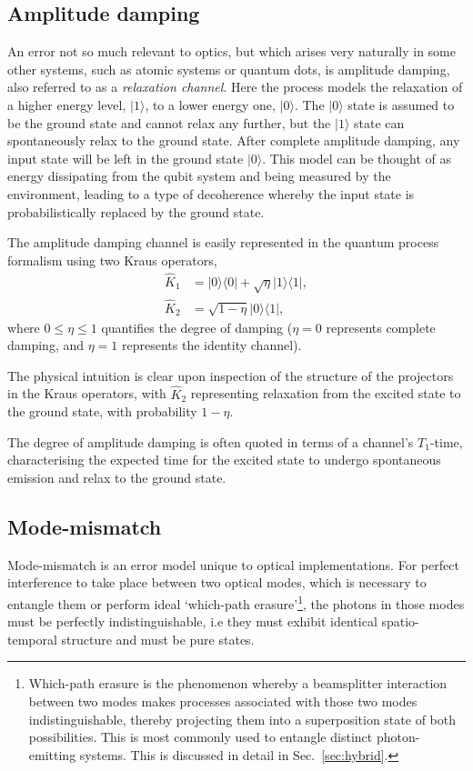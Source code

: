 \documentclass[aps, rmp, twocolumn, amsmath, amssymb, nofootinbib, superscriptaddress, longbibliography, floatfix, table-of-contents, eqsecnum]{revtex4-1}
\newcommand{\bra}[1]{\langle#1|}
\newcommand{\ket}[1]{|#1\rangle}
\begin{document}
\subsection{Amplitude damping}  \label{sec:amp_damp}

An error not so much relevant to optics, but which arises very naturally in some other systems, such as atomic systems or quantum dots, is amplitude damping, also referred to as a \textit{relaxation channel}. Here the process models the relaxation of a higher energy level, $\ket{1}$, to a lower energy one, $\ket{0}$. The $\ket{0}$ state is assumed to be the ground state and cannot relax any further, but the $\ket{1}$ state can spontaneously relax to the ground state. After complete amplitude damping, any input state will be left in the ground state $\ket{0}$. This model can be thought of as energy dissipating from the qubit system and being measured by the environment, leading to a type of decoherence whereby the input state is probabilistically replaced by the ground state.

The amplitude damping channel is easily represented in the quantum process formalism using two Kraus operators,
\begin{align}
\hat{K}_1 &= \ket{0}\bra{0} + \sqrt\eta\ket{1}\bra{1}, \nonumber \\
\hat{K}_2 &= \sqrt{1-\eta}\ket{0}\bra{1}, 
\end{align}
where \mbox{$0\leq\eta\leq 1$} quantifies the degree of damping (\mbox{$\eta=0$} represents complete damping, and \mbox{$\eta=1$} represents the identity channel).

The physical intuition is clear upon inspection of the structure of the projectors in the Kraus operators, with $\hat{K}_2$ representing relaxation from the excited state to the ground state, with probability \mbox{$1-\eta$}.

The degree of amplitude damping is often quoted in terms of a channel's $T_1$-time, characterising the expected time for the excited state to undergo spontaneous emission and relax to the ground state.

%
%

\subsection{Mode-mismatch} \label{sec:MM_error} 

Mode-mismatch is an error model unique to optical implementations. For perfect interference to take place between two optical modes, which is necessary to entangle them or perform ideal `which-path erasure'\footnote{Which-path erasure is the phenomenon whereby a beamsplitter interaction between two modes makes processes associated with those two modes indistinguishable, thereby projecting them into a superposition state of both possibilities. This is most commonly used to entangle distinct photon-emitting systems. This is discussed in detail in Sec.~\ref{sec:hybrid}.}, the photons in those modes must be perfectly indistinguishable, i.e they must exhibit identical spatio-temporal structure \cite{bib:RohdeMauererSilberhorn07} and must be pure states.
\end{document}

